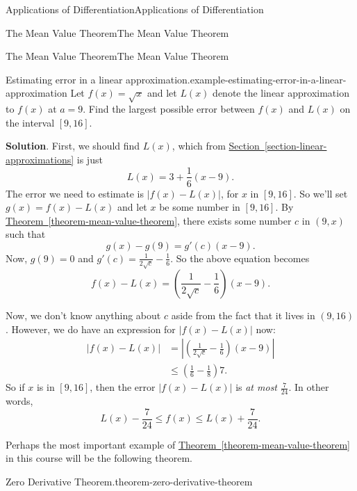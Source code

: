 \documentclass[10pt,]{book}
\numberwithin{equation}{section}
\begin{document}
\begin{chapterptx}{Applications of Differentiation}{}{Applications of Differentiation}{}{}
\begin{sectionptx}{The Mean Value Theorem}{}{The Mean Value Theorem}{}{}
\begin{subsectionptx}{The Mean Value Theorem}{}{The Mean Value Theorem}{}{}
\begin{example}{Estimating error in a linear approximation.}{example-estimating-error-in-a-linear-approximation}%
\hypertarget{p-340}{}%
Let \(f(x) = \sqrt{x}\) and let \(L(x)\) denote the linear approximation to \(f(x)\) at \(a=9\). Find the largest possible error between \(f(x)\) and \(L(x)\) on the interval \([9,16]\).%
\par\smallskip%
\noindent\textbf{Solution}.\hypertarget{solution-74}{}\quad%
\hypertarget{p-341}{}%
First, we should find \(L(x)\), which from \hyperref[section-linear-approximations]{Section~\ref{section-linear-approximations}} is just%
\begin{equation*}
L(x) = 3 + \frac{1}{6}(x-9).
\end{equation*}
The error we need to estimate is \(|f(x) - L(x)|\), for \(x\) in \([9,16]\). So we'll set \(g(x) = f(x) - L(x)\) and let \(x\) be some number in \([9,16]\). By \hyperref[theorem-mean-value-theorem]{Theorem~\ref{theorem-mean-value-theorem}}, there exists some number \(c\) in \((9,x)\) such that%
\begin{equation*}
g(x) - g(9) = g'(c)(x-9).
\end{equation*}
Now, \(g(9) = 0\) and \(g'(c) = \frac{1}{2\sqrt{c}} - \frac{1}{6}\). So the above equation becomes%
\begin{equation*}
f(x) - L(x) = \left(\frac{1}{2\sqrt{c}} - \frac{1}{6}\right)(x-9).
\end{equation*}
%
\par
\hypertarget{p-342}{}%
Now, we don't know anything about \(c\) aside from the fact that it lives in \((9,16)\). However, we do have an expression for \(|f(x) - L(x)|\) now:%
\begin{align*}
|f(x) - L(x)| & = \left|\left(\frac{1}{2\sqrt{c}} - \frac{1}{6}\right)(x-9)\right|\\
& \leq \left(\frac{1}{6} - \frac{1}{8}\right)7. 
\end{align*}
So if \(x\) is in \([9,16]\), then the error \(|f(x) - L(x)|\) is \emph{at most} \(\frac{7}{24}\). In other words,%
\begin{equation*}
L(x) - \frac{7}{24} \leq f(x) \leq L(x) + \frac{7}{24}.
\end{equation*}
%
\end{example}
\hypertarget{p-343}{}%
Perhaps the most important example of \hyperref[theorem-mean-value-theorem]{Theorem~\ref{theorem-mean-value-theorem}} in this course will be the following theorem.%
\begin{theorem}{Zero Derivative Theorem.}{}{theorem-zero-derivative-theorem}%

\end{theorem}
\end{subsectionptx}
\end{sectionptx}
\end{chapterptx}
\end{document}
